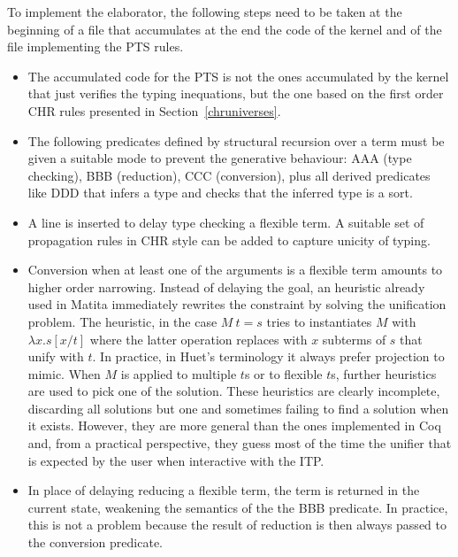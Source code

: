 \documentclass{easychair}
\begin{document}
To implement the elaborator, the following steps need to be taken at the beginning of a file that accumulates at the end the code of the kernel and of the file implementing the PTS rules.
\begin{itemize}
\item The accumulated code for the PTS is not the ones accumulated by the kernel that just verifies the typing inequations, but the one based on the first order CHR rules presented in Section~\ref{chruniverses}.
\item The following predicates defined by structural recursion over a term
 must be given a suitable mode to prevent the generative behaviour:
 AAA (type checking), BBB (reduction), CCC (conversion), plus all derived
 predicates like DDD that infers a type and checks that the inferred type is
 a sort.
\item A line is inserted to delay type checking a flexible term. A suitable set of propagation rules in CHR style can be added to capture unicity of typing.
\item Conversion when at least one of the arguments is a flexible term amounts to higher order narrowing. Instead of delaying the goal, an heuristic already used in Matita immediately rewrites the constraint by solving the unification problem. The heuristic, in the case $M~t = s$ tries to instantiates $M$ with
$\lambda x. s[x/t]$ where the latter operation replaces with $x$ subterms of $s$ that unify with $t$. In practice, in Huet's terminology it always prefer projection to mimic. When $M$ is applied to multiple $t$s or to flexible $t$s, further heuristics are used to pick one of the solution. These heuristics are clearly incomplete, discarding all solutions but one and sometimes failing to find a solution when it exists. However, they are more general than the ones implemented in Coq and, from a practical perspective, they guess most of the time the unifier that is expected by the user when interactive with the ITP.
\item In place of delaying reducing a flexible term, the term is returned in the current state, weakening the semantics of the the BBB predicate. In practice, this is not a problem because the result of reduction is then always passed to the conversion predicate.
\end{itemize}
\end{document}
